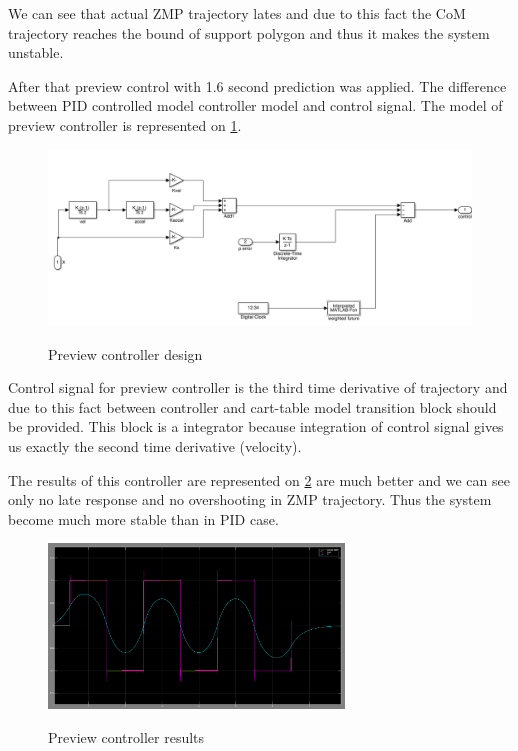 \documentclass[12pt,a4paper]{report}
\begin{document}
		We can see that actual ZMP trajectory lates and due to this fact the CoM trajectory reaches the bound of support polygon and thus it makes the system unstable.
		
		After that preview control with 1.6 second prediction was applied. The difference between PID controlled model controller model and control signal. The model of preview controller  is represented on \cref{fig:18}.
		
		\begin{figure}[h!]
			\vspace{-0.2cm}
			\centering
			{\includegraphics[width=1\textwidth]{18}}
			\caption{Preview controller design}
			\label{fig:18}
			\vspace{-0.1cm}
		\end{figure}
		
		Control signal for preview controller is the third time derivative of trajectory and due to this fact between controller and cart-table model transition block should be provided. This block is a integrator because integration of control signal gives us exactly the second time derivative (velocity).
		
		The results of this controller are represented on \cref{fig:19} are much better and we can see only no late response and no overshooting in ZMP trajectory. Thus the system become much more stable than in PID case. 
		
		\begin{figure}[h!]
			\vspace{-0.2cm}
			\centering
			{\includegraphics[width=0.7\textwidth]{19}}
			\caption{Preview controller results}
			\label{fig:19}
			\vspace{-0.1cm}
		\end{figure}
\end{document}
